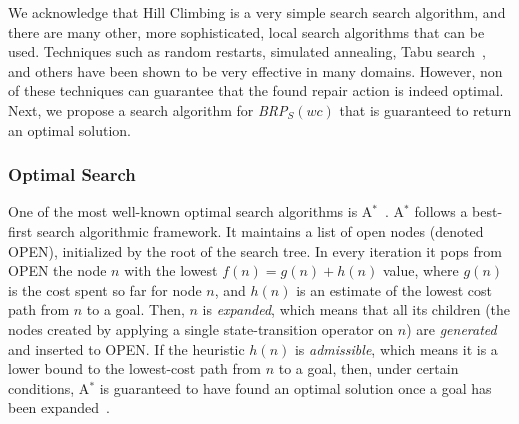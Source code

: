 \documentclass[review]{elsarticle}
\newcommand{\astar}{A$^*$}
\newcommand{\brpswc}{\textit{BRP$_S(wc)$}}
\begin{document}
We acknowledge that Hill Climbing is a very simple search search algorithm, and there are many other, more sophisticated, local search algorithms that can be used.  Techniques such as random restarts, simulated annealing, Tabu search~\cite{glover2013tabu}, and others have been shown to be very effective in many domains. However, non of these techniques can guarantee that the found repair action is indeed optimal. Next, we propose a search algorithm for \brpswc{} that is guaranteed to return an optimal solution. %




\subsubsection{Optimal Search}


One of the most well-known optimal search algorithms is \astar{}~\cite{hart1968formal}. \astar{} follows a best-first search algorithmic framework. It maintains a list of open nodes (denoted OPEN), initialized by the root of the search tree. 
In every iteration it pops from OPEN the node $n$ with the lowest $f(n)=g(n)+h(n)$ value, where $g(n)$ is the cost spent so far for node $n$, and $h(n)$ is an estimate of the lowest cost path from $n$ to a goal. Then, $n$ is {\em expanded}, which means that all its children (the nodes created by applying a single state-transition operator on $n$) are {\em generated} and inserted to OPEN. If the heuristic $h(n)$ is \emph{admissible}, which means it is a lower bound to the lowest-cost path from $n$ to a goal, then, under certain conditions, \astar{} is guaranteed to have found an optimal solution once a goal has been expanded~\cite{hart1968formal}. 
\end{document}
